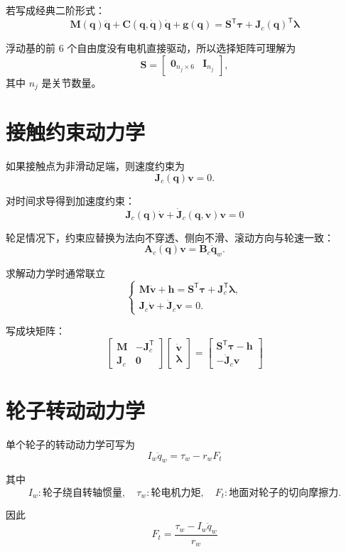 \documentclass[UTF8,11pt,a4paper]{ctexart}
\newcommand{\T}{^{\mathsf T}}
\newcommand{\bs}[1]{\bm{#1}}
\begin{document}
若写成经典二阶形式：
\[
\boxed{
\bs M(\bs q)\ddot{\bs q}
+\bs C(\bs q,\dot{\bs q})\dot{\bs q}
+\bs g(\bs q)
=
\bs S\T\bs \tau
+\bs J_c(\bs q)\T\bs \lambda
}
\]

浮动基的前 6 个自由度没有电机直接驱动，所以选择矩阵可理解为
\[
\bs S =
\begin{bmatrix}
\bs 0_{n_j\times 6} & \bs I_{n_j}
\end{bmatrix},
\]
其中 \(n_j\) 是关节数量。

\section{接触约束动力学}

如果接触点为非滑动足端，则速度约束为
\[
\bs J_c(\bs q)\bs v=0.
\]

对时间求导得到加速度约束：
\[
\boxed{
\bs J_c(\bs q)\dot{\bs v}
+\dot{\bs J}_c(\bs q,\bs v)\bs v
=0
}
\]

轮足情况下，约束应替换为法向不穿透、侧向不滑、滚动方向与轮速一致：
\[
\bs A_c(\bs q)\bs v
=
\bs B_c\dot{\bs q}_w.
\]

求解动力学时通常联立
\[
\begin{cases}
\bs M\dot{\bs v}+\bs h
=
\bs S\T\bs \tau+\bs J_c\T\bs \lambda,\\
\bs J_c\dot{\bs v}+\dot{\bs J}_c\bs v=0.
\end{cases}
\]

写成块矩阵：
\[
\boxed{
\begin{bmatrix}
\bs M & -\bs J_c\T\\
\bs J_c & \bs 0
\end{bmatrix}
\begin{bmatrix}
\dot{\bs v}\\
\bs \lambda
\end{bmatrix}
=
\begin{bmatrix}
\bs S\T\bs \tau-\bs h\\
-\dot{\bs J}_c\bs v
\end{bmatrix}
}
\]

\section{轮子转动动力学}

单个轮子的转动动力学可写为
\[
\boxed{
I_w\ddot q_w
=
\tau_w-r_w F_t
}
\]

其中
\[
I_w:\text{轮子绕自转轴惯量},\quad
\tau_w:\text{轮电机力矩},\quad
F_t:\text{地面对轮子的切向摩擦力}.
\]

因此
\[
\boxed{
F_t
=
\frac{\tau_w-I_w\ddot q_w}{r_w}
}
\]
\end{document}
